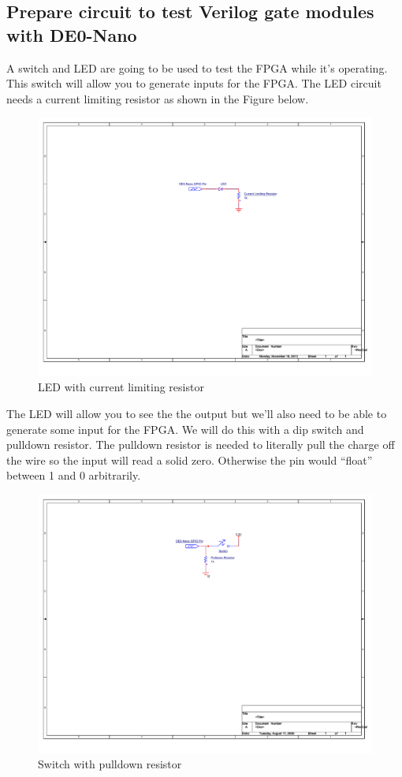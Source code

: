     \subsection{Prepare circuit to test Verilog gate modules with DE0-Nano}
      A switch and LED are going to be used to test the FPGA while it's operating. This switch will allow you to generate inputs for the FPGA. The LED circuit needs a current limiting resistor as shown in the Figure below.
      \begin{figure}[htpb]
        \label{LEDCircuit}
        \includegraphics[width=.48\textwidth]{Schematics/LED.pdf}
        \caption{LED with current limiting resistor}
      \end{figure}
      The LED will allow you to see the the output but we'll also need to be able to generate some input for
      the FPGA. We will do this with a dip switch and pulldown resistor. The pulldown resistor is needed
      to literally pull the charge off the wire so the input will read a solid zero. Otherwise the pin would ``float'' between 1 and 0 arbitrarily.

      \begin{figure}[htpb]
        \label{swPulldown}
        \includegraphics[width=.38\textwidth]{Schematics/SwitchCircuit.pdf}
        \caption{Switch with pulldown resistor}
      \end{figure}

